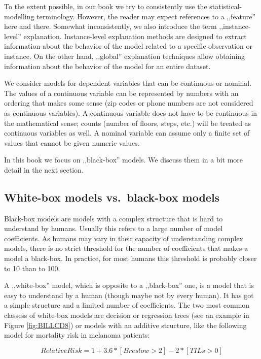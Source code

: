 \documentclass[12pt,]{krantz}
\theoremstyle{definition}
\theoremstyle{definition}
\theoremstyle{definition}
\theoremstyle{remark}
\begin{document}
To the extent possible, in our book we try to consistently use the
statistical-modelling terminology. However, the reader may expect
references to a ,,feature'' here and there. Somewhat inconsistently, we
also introduce the term ,,instance-level'' explanation. Instance-level
explanation methods are designed to extract information about the
behavior of the model related to a specific observation or instance. On
the other hand, ,,global'' explanation techniques allow obtaining
information about the behavior of the model for an entire dataset.

We consider models for dependent variables that can be continuous or
nominal. The values of a continuous variable can be represented by
numbers with an ordering that makes some sense (zip codes or phone
numbers are not considered as continuous variables). A continuous
variable does not have to be continuous in the mathematical sense;
counts (number of floors, steps, etc.) will be treated as continuous
variables as well. A nominal variable can assume only a finite set of
values that cannot be given numeric values.

In this book we focus on ,,black-box'' models. We discuss them in a bit
more detail in the next section.

\hypertarget{white-box-models-vs.black-box-models}{%
\subsection{White-box models vs.~black-box
models}\label{white-box-models-vs.black-box-models}}

Black-box models are models with a complex structure that is hard to
understand by humans. Usually this refers to a large number of model
coefficients. As humans may vary in their capacity of understanding
complex models, there is no strict threshold for the number of
coefficients that makes a model a black-box. In practice, for most
humans this threshold is probably closer to 10 than to 100.

A ,,white-box'' model, which is opposite to a ,,black-box'' one, is a
model that is easy to understand by a human (though maybe not by every
human). It has got a simple structure and a limited number of
coefficients. The two most common classess of white-box models are
decision or regression trees (see an example in Figure
\ref{fig:BILLCD8}) or models with an additive structure, like the
following model for mortality risk in melanoma patients:

\[
RelativeRisk = 1 + 3.6 * [Breslow > 2] - 2 * [TILs > 0] 
\]
\end{document}
